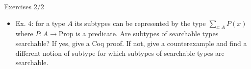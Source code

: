 \documentclass{beamer}
\begin{document}
\begin{frame}{Exercises 2/2}
\begin{itemize}
	\item Ex. 4: for a type $A$ its subtypes can be represented by the type $\displaystyle \sum_{x : A} P(x)$ where $P : A \to \text{Prop}$ is a predicate. Are subtypes of searchable types searchable? If yes, give a Coq proof. If not, give a counterexample and find a different notion of subtype for which subtypes of searchable types are searchable.
\end{itemize}
\end{frame}
\end{document}
